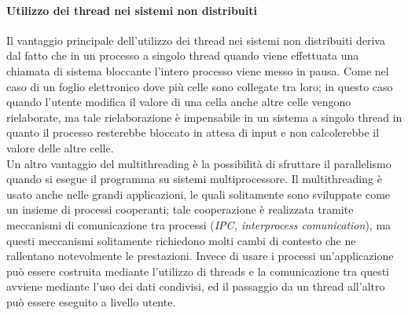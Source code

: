 \paragraph{Utilizzo dei thread nei sistemi non distribuiti}
Il vantaggio principale dell'utilizzo dei thread nei sistemi non distribuiti deriva dal fatto che in un processo  a singolo thread quando viene effettuata una chiamata di sistema bloccante l'intero processo viene messo in pausa. Come nel caso di un foglio elettronico dove più celle sono collegate tra loro; in questo caso quando l'utente modifica il valore di una cella anche altre celle vengono rielaborate, ma tale rielaborazione è impensabile in un sistema a singolo thread in quanto il processo resterebbe bloccato in attesa di input e non calcolerebbe il valore delle altre celle.\\
Un altro vantaggio del multithreading è la possibilità di sfruttare il parallelismo quando si esegue il programma su sistemi multiprocessore. Il multithreading è usato anche nelle grandi applicazioni, le quali solitamente sono sviluppate come un insieme di processi cooperanti; tale cooperazione è realizzata tramite meccanismi di comunicazione tra processi (\emph{IPC, interprocess comunication}), ma questi meccanismi solitamente richiedono molti cambi di contesto che ne rallentano notevolmente le prestazioni. Invece di usare i processi un'applicazione può essere costruita mediante l'utilizzo di threads e la comunicazione tra questi avviene mediante l'uso dei dati condivisi, ed il passaggio da un thread all'altro può essere eseguito a livello utente.
